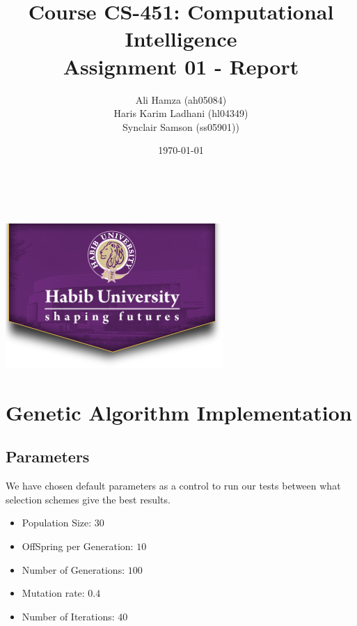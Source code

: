 \documentclass[11pt, letterpaper]{article}
\begin{document}
\title{\large Course CS-451: Computational Intelligence\\[0.5cm]
        \bf\Large Assignment 01 - Report}
\author{\large Ali Hamza (ah05084) \\ Haris Karim Ladhani (hl04349) \\ Synclair Samson (ss05901))}
\date{\today}
\makeatletter
    \begin{titlepage}
        \begin{center}
        \vbox{}\vspace{5cm}
            {\@title }\\[3cm] 
            {\@author}\\
            \vfill \includegraphics[scale=0.5]{images/logo.png}\\[1cm]
            {\@date}
        \end{center}
    \end{titlepage}
\makeatother

\newpage

\tableofcontents

\newpage

\section{Genetic Algorithm Implementation}
\subsection{Parameters}
We have chosen default parameters as a control to run our tests between what selection schemes give the best results.
\begin{itemize}
    \item Population Size: $30$
    \item OffSpring per Generation: $10$
    \item Number of Generations: $100$
    \item Mutation rate: $0.4$
    \item Number of Iterations: $40$ 
\end{itemize}
\end{document}
